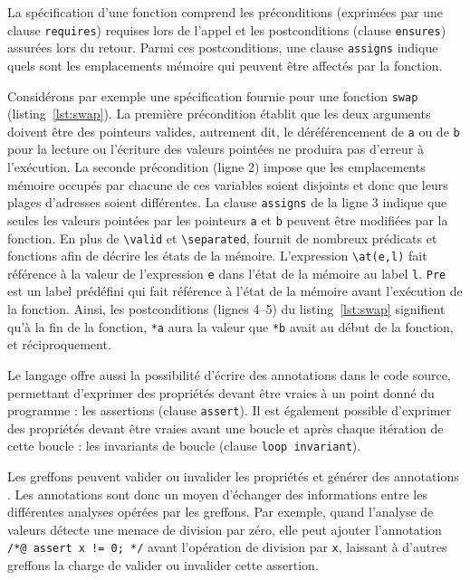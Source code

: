 La spécification d'une fonction comprend les préconditions (exprimées par une
clause \lstinline'requires') requises lors de l'appel et les postconditions
(clause \lstinline'ensures') assurées lors du retour.
Parmi ces postconditions, une clause \lstinline'assigns' indique quels sont les
emplacements mémoire qui peuvent être affectés par la fonction.



Considérons par exemple une spécification fournie pour une fonction
\lstinline'swap' (listing~\ref{lst:swap}).
La première précondition établit que les deux arguments doivent être des
pointeurs valides, autrement dit, le déréférencement de \lstinline'a' ou de
\lstinline'b' pour la lecture ou l'écriture des valeurs pointées ne produira pas
d'erreur à l'exécution.
La seconde précondition (ligne 2) impose que les emplacements mémoire occupés
par chacune de ces variables soient disjoints et donc que leurs plages
d'adresses soient différentes.
La clause \lstinline'assigns' de la ligne 3 indique que seules les valeurs
pointées par les pointeurs \lstinline'a' et \lstinline'b' peuvent être modifiées
par la fonction.
En plus de \lstinline'\valid' et \lstinline'\separated', \acsl fournit de
nombreux prédicats et fonctions afin de décrire les états de la mémoire.
L'expression \lstinline'\at(e,l)' fait référence à la valeur de l'expression
\lstinline'e' dans l'état de la mémoire au label \lstinline'l'.
\lstinline'Pre' est un label prédéfini qui fait référence à l'état de la mémoire
avant l'exécution de la fonction.
Ainsi, les postconditions (lignes 4--5) du listing~\ref{lst:swap} signifient
qu'à la fin de la fonction, \lstinline'*a' aura la valeur que \lstinline'*b'
avait au début de la fonction, et réciproquement.

Le langage \acsl offre aussi la possibilité d'écrire des annotations dans le
code source, permettant d'exprimer des propriétés devant être vraies à un point
donné du programme : les assertions (clause \lstinline'assert').
Il est également possible d'exprimer des propriétés devant être vraies avant une
boucle et après chaque itération de cette boucle : les invariants de boucle
(clause \lstinline'loop invariant').

Les greffons peuvent valider ou invalider les propriétés \acsl et
générer des annotations \acsl.
Les annotations sont donc un moyen d'échanger des informations entre les
différentes analyses opérées par les greffons.
Par exemple, quand l'analyse de valeurs détecte une menace de division par zéro,
elle peut ajouter l'annotation \lstinline'/*@ assert x != 0; */' avant
l'opération de division par \lstinline'x', laissant à d'autres greffons la
charge de valider ou invalider cette assertion.

